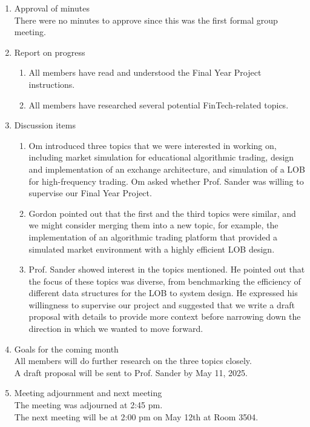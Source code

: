 \documentclass[12pt,a4paper]{article}
\begin{document}
\begin{enumerate}
\item Approval of minutes\\
There were no minutes to approve since this was the first formal group meeting.\\
\item Report on progress
\begin{enumerate}
\item All members have read and understood the Final Year Project instructions.\\
\item All members have researched several potential FinTech-related topics.\\
\end{enumerate}
\item Discussion items
\begin{enumerate}
\item Om introduced three topics that we were interested in working on, including market simulation for educational algorithmic trading, design and implementation of an exchange architecture, and simulation of a LOB for high-frequency trading. Om asked whether Prof. Sander was willing to supervise our Final Year Project.\\
\item Gordon pointed out that the first and the third topics were similar, and we might consider merging them into a new topic, for example, the implementation of an algorithmic trading platform that provided a simulated market environment with a highly efficient LOB design.\\
\item Prof. Sander showed interest in the topics mentioned. He pointed out that the focus of these topics was diverse, from benchmarking the efficiency of different data structures for the LOB to system design. He expressed his willingness to supervise our project and suggested that we write a draft proposal with details to provide more context before narrowing down the direction in which we wanted to move forward.\\
\end{enumerate}
\item Goals for the coming month\\
All members will do further research on the three topics closely.\\
A draft proposal will be sent to Prof. Sander by May 11, 2025.\\
\item Meeting adjournment and next meeting\\
The meeting was adjourned at 2:45 pm.\\
The next meeting will be at 2:00 pm on May 12th at Room 3504.
\end{enumerate}
\end{document}
